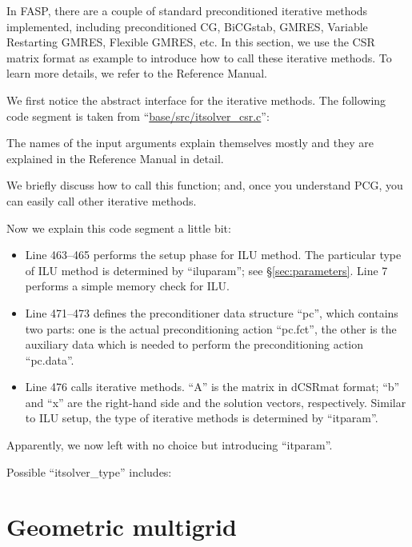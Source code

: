 \documentclass[11pt]{memoir}
\begin{document}
In FASP, there are a couple of standard preconditioned iterative methods~\cite{Saad.Saad.2003fv} implemented, including preconditioned CG, BiCGstab, GMRES, Variable Restarting GMRES, Flexible GMRES, etc. In this section, we use the CSR matrix format as example to introduce how to call these iterative methods. To learn more details, we refer to the Reference Manual.

We first notice the abstract interface for the iterative methods. The following code segment is taken from ``\url{base/src/itsolver\_csr.c}'':
%

%
The names of the input arguments explain themselves mostly and they are explained in the Reference Manual in detail.

We briefly discuss how to call this function; and, once you understand PCG, you can easily call other iterative methods.
%

%
Now we explain this code segment a little bit:
\begin{itemize}
\item Line 463--465 performs the setup phase for ILU method. The particular type of ILU method is determined by ``iluparam''; see \S\ref{sec:parameters}. Line 7 performs a simple memory check for ILU.
\item Line 471--473 defines the preconditioner data structure ``pc'', which contains two parts: one is the actual preconditioning action ``pc.fct'', the other is the auxiliary data which is needed to perform the preconditioning action ``pc.data''.
\item Line 476 calls iterative methods. ``A'' is the matrix in dCSRmat format; ``b'' and ``x'' are the right-hand side and the solution vectors, respectively. Similar to ILU setup, the type of iterative methods is determined by ``itparam''.
\end{itemize}

Apparently, we now left with no choice but introducing ``itparam''.
%

%
Possible ``itsolver\_type'' includes:
%

%

\section{Geometric multigrid}\label{sec:gmg}
\end{document}
